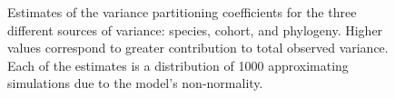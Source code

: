 \documentclass{nature}
\begin{document}
\begin{figure}[ht]
  \caption{Estimates of the variance partitioning coefficients for the three different sources of variance: species, cohort, and phylogeny. Higher values correspond to greater contribution to total observed variance. Each of the estimates is a distribution of 1000 approximating simulations due to the model's non-normality.}
  \label{fig:vpc}
\end{figure}
\end{document}
